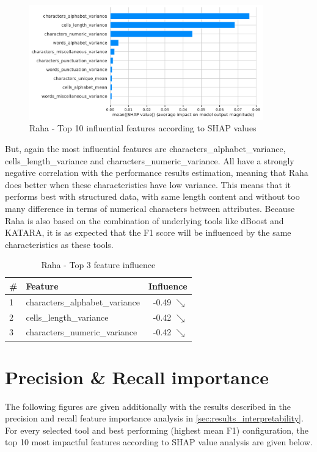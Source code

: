 \begin{figure}[H]
    \centering
    \includegraphics[width=0.9\textwidth]{thesis/Figures/RQ4/Shap_cell_f1_Raha.pdf}
    \caption{Raha - Top 10 influential features according to SHAP values}
    \label{fig:most_impact_features_raha}
\end{figure}

But, again the most influential features are characters\_alphabet\_variance, cells\_length\_variance and characters\_numeric\_variance. All have a strongly negative correlation with the performance results estimation, meaning that Raha does better when these characteristics have low variance. This means that it performs best with structured data, with same length content and without too many difference in terms of numerical characters between attributes. Because Raha is also based on the combination of underlying tools like dBoost and KATARA, it is as expected that the F1 score will be influenced by the same characteristics as these tools.

\begin{table}[H]
\centering
\begin{tabular}{llr}
\toprule
 \# &                         Feature &         Influence \\
\midrule
 1 &  characters\_alphabet\_variance &  -0.49 $\searrow$ \\
 2 &         cells\_length\_variance &  -0.42 $\searrow$ \\
 3 &   characters\_numeric\_variance &  -0.42 $\searrow$ \\
\bottomrule
\end{tabular}
\caption{Raha - Top 3 feature influence}
\label{tab:top_influence_features_raha}
\end{table}


\section{Precision \& Recall importance}
\label{appsec:prec_rec_feature_importance}
The following figures are given additionally with the results described in the precision and recall feature importance analysis in \autoref{sec:results_interpretability}. For every selected tool and best performing (highest mean F1) configuration, the top 10 most impactful features according to SHAP value analysis are given below.

